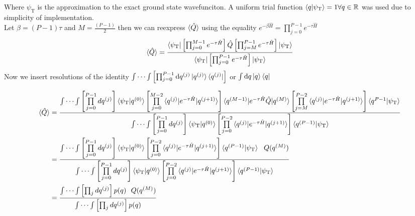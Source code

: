 \documentclass[12pt,letterpaper,oneside,final,titlepage]{article}               %
\numberwithin{equation}{section} %
\newcommand{\psiT}{\psi_{\textrm{T}}}
\newcommand{\eBH}{e^{-\beta\hat{H}}}
\newcommand{\eTH}{e^{-\tau\hat{H}}}
\begin{document}
Where $\psiT$ is the approximation to the exact ground state wavefunciton. 
A uniform trial function $\braket{q|\psiT} = 1 \forall q \in \mathbb{R} $ was used due to simplicity of implementation. \\
Let $\beta = (P-1)\tau$ and $M = \frac{(P-1)}{2}$ then we can reexpress $\braket{\hat{Q}}$ using the equality $\eBH = \prod_{j=0}^{P-1} \eTH$
\begin{align*}
    \braket{\hat{Q}} = \frac{\braket{\psiT|
                            \left[\prod_{j=0}^{M-1} \eTH\right]
                            \hat{Q}
                            \left[\prod_{j=M}^{P-1} \eTH\right]
                            |\psiT}}
                            {\braket{\psiT|\left[\prod_{j=0}^{P-1} \eTH\right]|\psiT}} 
\end{align*}
Now we insert resolutions of the identity
$\int\cdots\int\left[\prod_{j=0}^{P-1}\dif q^{(j)}\ket{q^{(j)}}\bra{q^{(j)}}\right]$ or
$\int \dif q\ket{q}\bra{q}$

\begin{align}
    \braket{\hat{Q}} 
        &=\frac{\int\cdots\int\left[\prod\limits_{j=0}^{P-1}dq^{(j)}\right]
                \braket{\psiT|q^{(0)}}
                \left[\prod\limits_{j=0}^{M-2}\braket{q^{(j)}|\eTH|q^{(j+1)}}\right]
                \braket{q^{(M-1)}|\eTH\hat{Q}|q^{(M)}}
                \left[\prod\limits_{j=M}^{P-2}\braket{q^{(j)}|\eTH|q^{(j+1)}}\right]
                \braket{q^{P-1}|\psiT}
                }
               {\int\cdots\int\left[\prod\limits_{j=0}^{P-1}dq^{(j)}\right]
                \braket{\psiT|q^{(0)}}
                \left[\prod\limits_{j=0}^{P-2}\braket{q^{(j)}|\eTH|q^{(j+1)}}\right]
                \braket{q^{(P-1)}|\psiT}
                }
    \\  &=\frac{\int\cdots\int\left[\prod\limits_{j=0}^{P-1}dq^{(j)}\right]
                \braket{\psiT|q^{(0)}}
                \left[\prod\limits_{j=0}^{P-2}\braket{q^{(j)}|\eTH|q^{(j+1)}}\right]
                \braket{q^{(P-1)}|\psiT}
                \,\,\,\,Q(q^{(M)})
                }
               {\int\cdots\int\left[\prod\limits_{j=0}^{P-1}dq^{(j)}\right]
                \braket{\psiT|q^{(0)}}
                \left[\prod\limits_{j=0}^{P-2}\braket{q^{(j)}|\eTH|q^{(j+1)}}\right]
                \braket{q^{(P-1)}|\psiT}
                }
    \\  &=\frac{\int\cdots\int\left[\prod_{j}dq^{(j)}\right]
                p(q)
                \,\,\,\,Q(q^{(M)})
                }
               {\int\cdots\int\left[\prod_{j}dq^{(j)}\right]
                p(q)
                }
\end{align}
\end{document}

